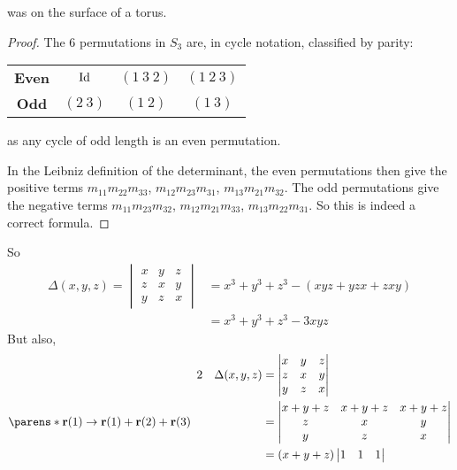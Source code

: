 \documentclass[fleqn,a4paper,11pt]{article}
\begin{document}
\begin{enumerate}[label=\textbf{\arabic*.}]
\begin{lemma}
    was on the surface of a torus.
   \end{lemma}
   \begin{proof}
    The \(6\) permutations in \(S_3\) are, in cycle notation, classified by
    parity:
    \begin{center}
     \begin{tabular}{*4c}
      \bfseries Even & \(\operatorname{Id}\) & \((1\ 3\ 2)\) & \((1\ 2\ 3)\) \\
      \bfseries Odd & \((2\ 3)\) & \((1\ 2)\) & \((1\ 3)\)
     \end{tabular}
    \end{center}
    as any cycle of odd length is an even permutation.

    In the Leibniz definition of the determinant, the even permutations
    then give the positive terms
    \({m_{11} m_{22} m_{33}}\),
    \({m_{12} m_{23} m_{31}}\),
    \({m_{13} m_{21} m_{32}}\).
    The odd permutations give the negative terms
    \(m_{11} m_{23} m_{32}\),
    \(m_{12} m_{21} m_{33}\),
    \(m_{13} m_{22} m_{31}\). So this is indeed a correct formula.
   \end{proof}
   So
   \begin{align*}
    \Delta(x, y, z) =
    \begin{vmatrix}
     x & y & z \\
     z & x & y \\
     y & z & x
    \end{vmatrix}
     &= x^3 + y^3 + z^3 - (xyz + yzx + zxy) \\
     &= x^3 + y^3 + z^3 - 3xyz
   \end{align*}
   But also,
   \begin{alignat*}2
    && \Delta(x, y, z) &= \begin{vmatrix}
     x & y & z \\
     z & x & y \\
     y & z & x
    \end{vmatrix} \\
    \parens*{
     \vec r(1) \to \vec r(1) + \vec r(2) + \vec r(3)
    } \quad
    && &= \begin{vmatrix}
     x + y + z & x + y + z & x + y + z \\
     z & x & y \\
     y & z & x
    \end{vmatrix} \\
    && &= (x + y + z)\begin{vmatrix}
     1 & 1 & 1 \\

\end{vmatrix}
\end{alignat*}
\end{enumerate}
\end{document}

